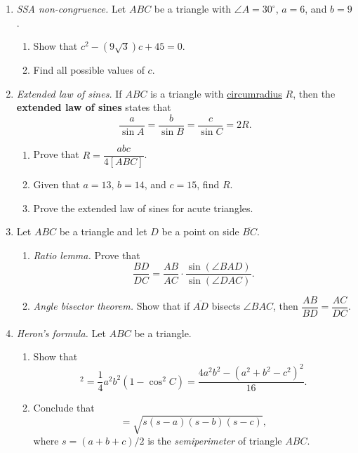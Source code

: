 \begin{enumerate}
\item \emph{SSA non-congruence.} Let $ABC$ be a triangle with $\angle A = 30^{\circ}$, $a = 6$, and $b = 9$.
\begin{enumerate}
\item Show that $c^2 - (9\sqrt{3})c + 45 = 0$.
\item Find all possible values of $c$.
\end{enumerate}
\item \emph{Extended law of sines.} If $ABC$ is a triangle with \href{https://en.wikipedia.org/wiki/Circumcircle}{circumradius} $R$, then the \textbf{extended law of sines} states that
\begin{equation*}
\frac{a}{\sin A} = \frac{b}{\sin B} = \frac{c}{\sin C} = 2R.
\end{equation*}
\begin{enumerate}
\item Prove that $R = \dfrac{abc}{4[ABC]}$.
\item Given that $a = 13$, $b = 14$, and $c = 15$, find $R$.
\item Prove the extended law of sines for acute triangles.
\end{enumerate}
\item Let $ABC$ be a triangle and let $D$ be a point on side $\overline{BC}$.
\begin{enumerate}
\item \emph{Ratio lemma.} Prove that
\begin{equation*}
\frac{BD}{DC} = \frac{AB}{AC}\cdot\frac{\sin(\angle BAD)}{\sin(\angle DAC)}.
\end{equation*}
\item \emph{Angle bisector theorem.} Show that if $\overline{AD}$ bisects $\angle BAC$, then $\dfrac{AB}{BD} = \dfrac{AC}{DC}$.
\end{enumerate}
\item \emph{Heron's formula.} Let $ABC$ be a triangle.
\begin{enumerate}
\item Show that
\begin{equation*}
[ABC]^2 = \frac{1}{4}a^2b^2(1 - \cos^2 C) = \frac{4a^2b^2 - (a^2 + b^2 - c^2)^2}{16}.
\end{equation*}
\item Conclude that
\begin{equation*}
[ABC] = \sqrt{s(s - a)(s - b)(s - c)},
\end{equation*}
where $s = (a + b + c)/2$ is the \emph{semiperimeter} of triangle $ABC$.
\end{enumerate}
\end{enumerate}


